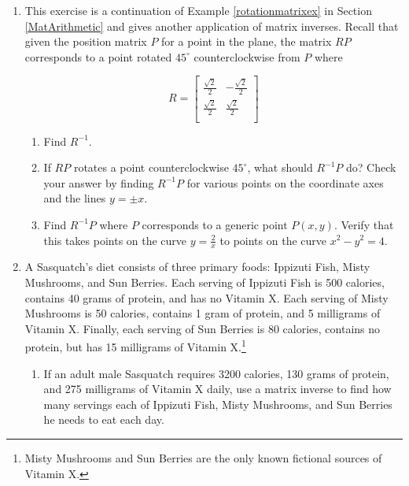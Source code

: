 \begin{enumerate}
\setcounter{enumi}{\value{HW}}

\item  This exercise is a continuation of Example \ref{rotationmatrixex} in Section \ref{MatArithmetic} and gives another application of matrix inverses.  Recall that given the position matrix $P$ for a point in the plane, the matrix $RP$ corresponds to a point rotated $45^{\circ}$ counterclockwise from $P$ where
 
\[R = \left[ \begin{array}{rr} \frac{\sqrt{2}}{2} & -\frac{\sqrt{2}}{2} \\[3pt] \frac{\sqrt{2}}{2} & \frac{\sqrt{2}}{2} \\ \end{array} \right]\]
 
\begin{enumerate}

\item  Find $R^{-1}$.
\item  If $RP$ rotates a point counterclockwise $45^{\circ}$, what should $R^{-1}P$ do?  Check your answer by finding $R^{-1}P$ for various points on the coordinate axes and the lines $y=\pm x$.
\item  Find $R^{-1}P$ where $P$ corresponds to a generic point $P(x,y)$. Verify that this takes points on the curve $y=\frac{2}{x}$ to points on the curve $x^2-y^2=4$.

\end{enumerate}

\item \label{SasquatchDiet} A Sasquatch's diet consists of three primary foods:  Ippizuti Fish, Misty Mushrooms, and Sun Berries.  Each serving of Ippizuti Fish is 500 calories, contains 40 grams of protein, and has no Vitamin X.  Each serving of Misty Mushrooms is 50 calories, contains 1 gram of protein, and 5 milligrams of Vitamin X.  Finally, each serving of Sun Berries is 80 calories, contains no protein, but has 15 milligrams of Vitamin X.\footnote{Misty Mushrooms and Sun Berries are the only known fictional sources of Vitamin X.}

\begin{enumerate}

\item  If an adult male Sasquatch requires 3200 calories, 130 grams of protein, and 275 milligrams of Vitamin X daily, use a matrix inverse to find how many servings each of Ippizuti Fish, Misty Mushrooms, and Sun Berries he needs to eat each day.


\end{enumerate}
\end{enumerate}
